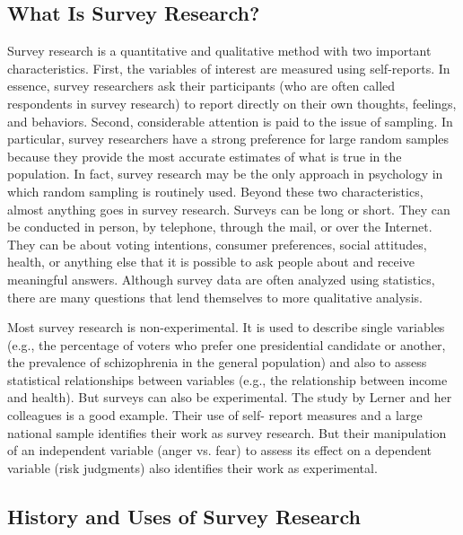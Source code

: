 \subsection{What Is Survey Research?}

Survey research is a quantitative and qualitative method with two important characteristics. First, the variables of interest are measured using self-reports. In essence, survey researchers ask their participants (who are often called respondents in survey research) to report directly on their own thoughts, feelings, and behaviors. Second, considerable attention is paid to the issue of sampling. In particular, survey researchers have a strong preference for large random samples because they provide the most accurate estimates of what is true in the population. In fact, survey research may be the only approach in psychology in which random sampling is routinely used. Beyond these two characteristics, almost anything goes in survey research. Surveys can be long or short. They can be conducted in person, by telephone, through the mail, or over the Internet. They can be about voting intentions, consumer preferences, social attitudes, health, or anything else that it is possible to ask people about and receive meaningful answers. Although survey data are often analyzed using statistics, there are many questions that lend themselves to more qualitative analysis.

Most survey research is non-experimental. It is used to describe single variables (e.g., the percentage of voters who prefer one presidential candidate or another, the prevalence of schizophrenia in the general population) and also to assess statistical relationships between variables (e.g., the relationship between income and health). But surveys can also be experimental. The study by Lerner and her colleagues is a good example. Their use of self- report measures and a large national sample identifies their work as survey research. But their manipulation of an independent variable (anger vs. fear) to assess its effect on a dependent variable (risk judgments) also identifies their work as experimental.

\subsection{History and Uses of Survey Research}

